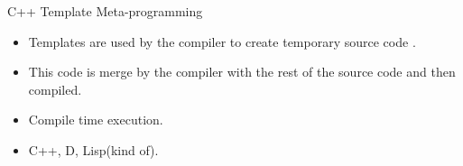 \begin{frame}{C++ Template Meta-programming}
    \begin{itemize}
        \item Templates are used by the compiler to create temporary source code
            \cite{wikiTM}.

        \item This code is merge by the compiler with the rest of the source code
            and then compiled\cite{wikiTM}.

        \item Compile time execution\cite{wikiTM}.

        \item C++, D, Lisp(kind of)\cite{wikiTM}.
    \end{itemize}
\end{frame}

